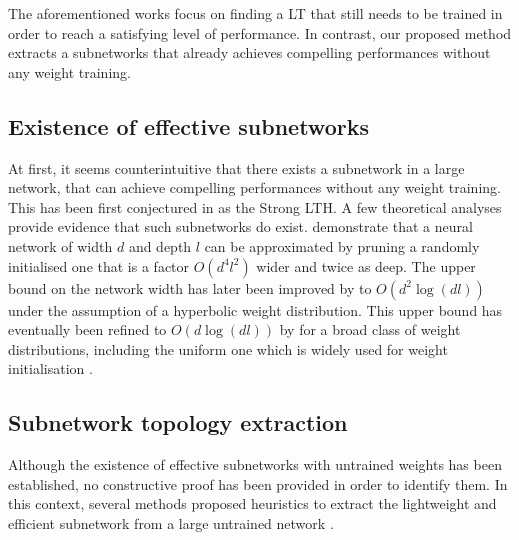 The aforementioned works
\cite{DBLP:conf/iclr/FrankleC19,DBLP:conf/icml/FrankleD0C20,DBLP:conf/iclr/LiuSZHD19}
focus on finding a \acl{LT} that still needs to be trained in order to reach a
satisfying level of performance. In contrast, our proposed method extracts a
subnetworks that already achieves compelling performances without any weight
training.\\ 


\subsection{Existence of effective subnetworks} 
At first, it seems counterintuitive that there exists a subnetwork in a large
network, that can achieve compelling performances without any weight training.
This has been first conjectured in \cite{DBLP:conf/cvpr/RamanujanWKFR20} as the
Strong \acl{LTH}. A few theoretical analyses provide evidence that such
subnetworks do exist. \cite{DBLP:conf/icml/MalachYSS20} demonstrate that a
neural network of width $d$ and depth $l$ can be approximated by pruning a
randomly initialised one that is a factor $O(d^4l^2)$ wider and twice as deep.
The  upper bound on the network width has later been improved by
\cite{DBLP:conf/nips/OrseauHR20} to $O(d^2\log(dl))$ under the assumption of a
hyperbolic weight distribution. This upper bound has eventually been refined to
$O(d\log(dl))$ by \cite{DBLP:conf/nips/PensiaRNVP20} for a broad class of weight
distributions, including the uniform one which is widely used for weight
initialisation \cite{DBLP:conf/iccv/HeZRS15}.\\

\subsection{Subnetwork topology extraction}\label{sec:chap2:subnetwork_topology_extraction}
Although the existence of effective subnetworks with untrained weights has been
established, no constructive proof has been provided in order to identify them.
In this context, several methods proposed heuristics to extract the lightweight
and efficient subnetwork from a large untrained network
\cite{DBLP:conf/nips/ZhouLLY19,DBLP:conf/cvpr/RamanujanWKFR20}.\\

